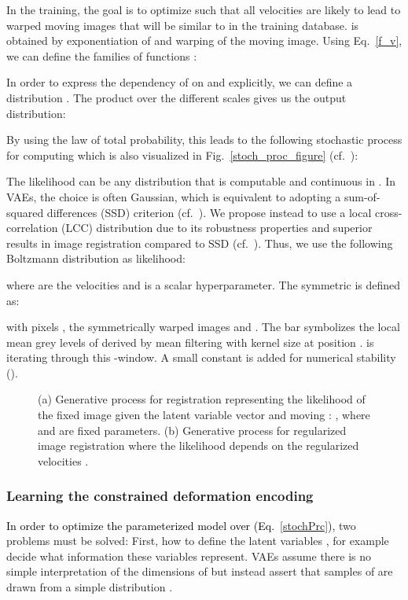\documentclass[journal]{IEEEtran}
\newcommand{\update}[1]{\textcolor{black}{#1}}
\begin{document}
In the training, the goal is to optimize  such that all velocities  are likely to lead to warped moving images  that will be similar to  in the training database.   is obtained by exponentiation of  and warping of the moving image. Using Eq.\ \ref{f_v}, we can define the families of functions : 

In order to express the dependency of  on  and   explicitly, we can define a distribution . The product over the different scales gives us the output distribution: 

By using the law of total probability, this leads to the following stochastic process for computing  which is also visualized in Fig.~\ref{stoch_proc_figure} (cf.\ \cite{kingma2014semi}):

The likelihood  can be any distribution that is computable and continuous in . In VAEs, the choice is often Gaussian, which is equivalent to adopting a sum-of-squared differences (SSD) criterion (cf.\ \cite{kingma2013auto}). We propose instead to use a local cross-correlation (LCC) distribution due to its robustness properties and superior results in image registration compared to SSD (cf.\ \cite{lorenzi2013lcc,avants2011reproducible}). Thus, we use the following Boltzmann distribution as likelihood:

where  are the velocities and  is a scalar hyperparameter. The symmetric  is defined as: 

with  pixels , the symmetrically warped images  and . The bar  symbolizes the local mean grey levels of  derived by mean filtering with kernel size  at position .  is iterating through this -window. A small constant  is added for numerical stability (). 

\begin{figure}[tb]
\centering 
{}\hfill
{}
\caption{\small{(a) Generative process for registration representing the likelihood of the fixed image  given the latent variable vector  and moving : , where  and  are fixed parameters. (b) Generative process for regularized image registration where the likelihood depends on the regularized velocities .}}
\end{figure}


\subsubsection{Learning the constrained deformation encoding}
\update{In order to optimize the parameterized model over  (Eq.~\ref{stochPrc}),} two problems must be solved: First, how to define the latent variables , for example decide what information these variables represent. VAEs assume there is no simple interpretation of the dimensions of  but instead assert that samples of  are drawn from a simple distribution . 
\end{document}
